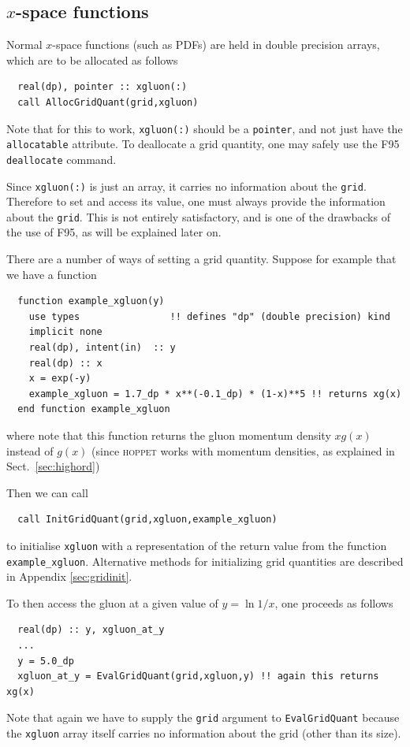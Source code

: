 \documentclass[12pt]{article}
\newcommand{\hoppet}{\textsc{hoppet}\xspace}
\newcommand{\ttt}[1]{\texttt{#1}}
\begin{document}
\subsection{$x$-space functions}
\label{sec:xspc}

Normal $x$-space functions (such as PDFs) are
held in double precision arrays, which are to be allocated as follows
\begin{lstlisting}
  real(dp), pointer :: xgluon(:)
  call AllocGridQuant(grid,xgluon)
\end{lstlisting}
Note that for this to work, \texttt{xgluon(:)} should be a
\texttt{pointer}, and not just 
have the \texttt{allocatable} attribute. To
deallocate a grid quantity, one may safely use the F95
\texttt{deallocate} command.

Since \texttt{xgluon(:)} is just an array, it carries no information
about the \texttt{grid}. Therefore to set and access its value, one
must always provide the information about the \texttt{grid}. This is
not entirely satisfactory, and is one of the drawbacks of the use of
F95, as will be explained later on.

There are a number of ways of setting a grid quantity. Suppose 
for example  that we have
a function
\begin{lstlisting}
  function example_xgluon(y)
    use types                !! defines "dp" (double precision) kind
    implicit none
    real(dp), intent(in)  :: y
    real(dp) :: x    
    x = exp(-y)
    example_xgluon = 1.7_dp * x**(-0.1_dp) * (1-x)**5 !! returns xg(x)  
  end function example_xgluon
\end{lstlisting}
where note that this function returns the gluon
momentum density $xg(x)$ instead of
$g(x)$ (since \hoppet works with momentum densities,
as explained in Sect.~\ref{sec:highord})

Then we can call
\begin{lstlisting}
  call InitGridQuant(grid,xgluon,example_xgluon)
\end{lstlisting}
to initialise \texttt{xgluon} with a representation of the return value
from the function \texttt{example\_xgluon}.
Alternative methods for initializing grid quantities
are described in Appendix \ref{sec:gridinit}.

To then access the gluon at a given value of $y = \ln 1/x$, one
proceeds as follows
\begin{lstlisting}
  real(dp) :: y, xgluon_at_y
  ...
  y = 5.0_dp
  xgluon_at_y = EvalGridQuant(grid,xgluon,y) !! again this returns xg(x)
\end{lstlisting}
Note that again we have to supply 
the \texttt{grid} argument to \ttt{EvalGridQuant}
because the \ttt{xgluon} array itself carries no information about the
grid (other than its size).
\end{document}
